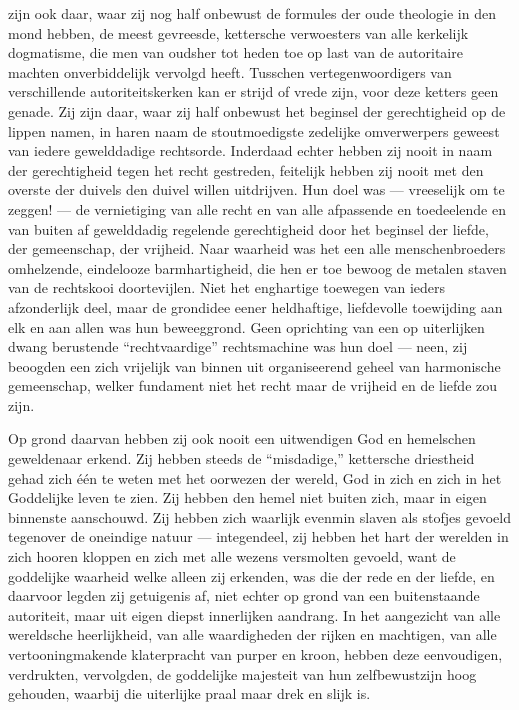 \documentclass[a4paper, 12pt, oneside, dutch]{article}
\begin{document}
zijn ook daar, waar zij nog half onbewust de formules der oude theologie in den mond hebben, de meest gevreesde, kettersche verwoesters van alle kerkelijk dogmatisme, die men van oudsher tot heden toe op last van de autoritaire machten onverbiddelijk vervolgd heeft. Tusschen vertegenwoordigers van verschillende autoriteitskerken kan er strijd of vrede zijn, voor deze ketters geen genade. Zij zijn daar, waar zij half onbewust het beginsel der gerechtigheid op de lippen namen, in haren naam de stoutmoedigste zedelijke omverwerpers geweest van iedere gewelddadige rechtsorde. Inderdaad echter hebben zij nooit in naam der gerechtigheid tegen het recht gestreden, feitelijk hebben zij nooit met den overste der duivels den duivel willen uitdrijven. Hun doel was --- vreeselijk om te zeggen! --- de vernietiging van alle recht en van alle afpassende en toedeelende en van buiten af gewelddadig regelende gerechtigheid door het beginsel der liefde, der gemeenschap, der vrijheid. Naar waarheid was het een alle menschenbroeders omhelzende, eindelooze barmhartigheid, die hen er toe bewoog de metalen staven van de rechtskooi doortevijlen. Niet het enghartige toewegen van ieders afzonderlijk deel, maar de grondidee eener heldhaftige, liefdevolle toewijding aan elk en aan allen was hun beweeggrond. Geen oprichting van een op uiterlijken dwang berustende "`rechtvaardige"' rechtsmachine was hun doel --- neen, zij beoogden een zich vrijelijk van binnen uit organiseerend geheel van harmonische gemeenschap, welker fundament niet het recht maar de vrijheid en de liefde zou zijn.

Op grond daarvan hebben zij ook nooit een uitwendigen God en hemelschen geweldenaar erkend. Zij hebben steeds de "`misdadige,"' kettersche driestheid gehad zich één te weten met het oorwezen der wereld, God in zich en zich in het Goddelijke leven te zien. Zij hebben den hemel niet buiten zich, maar in eigen binnenste aanschouwd. Zij hebben zich waarlijk evenmin slaven als stofjes gevoeld tegenover de oneindige natuur --- integendeel, zij hebben het hart der werelden in zich hooren kloppen en zich met alle wezens versmolten gevoeld, want de goddelijke waarheid welke alleen zij erkenden, was die der rede en der liefde, en daarvoor legden zij getuigenis af, niet echter op grond van een buitenstaande autoriteit, maar uit eigen diepst innerlijken aandrang. In het aangezicht van alle wereldsche heerlijkheid, van alle waardigheden der rijken en machtigen, van alle vertooningmakende klaterpracht van purper en kroon, hebben deze eenvoudigen, verdrukten, vervolgden, de goddelijke majesteit van hun zelfbewustzijn hoog gehouden, waarbij die uiterlijke praal maar drek en slijk is.
\end{document}

